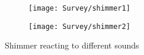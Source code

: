 \documentclass[../initial_thesis.tex]{subfiles}
\begin{document}
\begin{figure}
  \begin{subfigure}{0.5\textwidth}
    \texttt{[image: Survey/shimmer1]}
  \end{subfigure} 
  \begin{subfigure}{0.5\textwidth}
    \texttt{[image: Survey/shimmer2]}
  \end{subfigure}
  \caption{Shimmer reacting to different sounds}
  \label{fig:shimmer1}
\end{figure}
\end{document}
